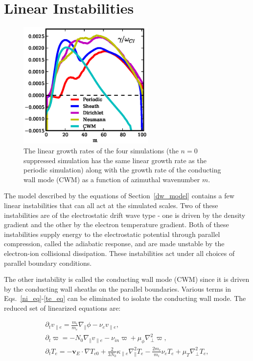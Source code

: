 \documentclass[showpacs,preprintnumbers,amsmath,amssymb,superscriptaddress,aip]{revtex4-1}
\def\beqar{\begin{eqnarray}}
\def\eeqar{\end{eqnarray}}
\newcommand{\pdt}{\partial_t}
\def\grad{\nabla}
\newcommand{\gradpar}{\grad_\parallel}
\newcommand{\gradperp}{\grad_\perp}
\newcommand{\vpe}{v_{\parallel e}}
\newcommand{\nue}{\nu_{e}}
\newcommand{\nuin}{\nu_{in}}
\newcommand{\kpe}{\kappa_{\parallel e}}
\newcommand{\fmie}{\frac{m_i}{m_e}}
\begin{document}
\section{Linear Instabilities}
\label{sec_linear}

\begin{figure}[!htbp]
\includegraphics[width=0.6\textwidth]{gamma_comparisons}
\hfil
\caption{The linear growth rates of the four simulations (the $n=0$ suppressed simulation has the same linear growth rate as the periodic simulation) along with the growth rate of 
the conducting wall mode (CWM) as a function of azimuthal wavenumber $m$.}
\label{drift_cwm_gamma}
\end{figure}


The model described by the equations of Section~\ref{dw_model} contains a few linear instabilities that can all act at the simulated scales. Two of these instabilities are of the electrostatic
drift wave type - one is driven by the density gradient and the other by the electron temperature gradient. Both of these instabilities supply energy to the electrostatic potential through parallel
compression, called the adiabatic response, and are made unstable by the electron-ion collisional dissipation. These instabilities act under all choices of parallel boundary conditions.

The other instability is called the conducting wall mode (CWM) since it is driven by the conducting wall sheaths on the parallel boundaries. Various terms in Eqs.~\ref{ni_eq}-\ref{te_eq} 
can be eliminated to isolate the conducting wall mode. The reduced set of linearized equations are:

\beqar
\label{ve_eq2}
\pdt \vpe = \fmie \gradpar \phi - \nue \vpe, \\
\label{rho_eq2}
\pdt \varpi = - N_0 \gradpar \vpe - \nuin \varpi + \mu_\phi \gradperp^2 \varpi, \\
\label{te_eq2}
\pdt T_e = - {\mathbf v_E} \cdot \grad T_{e0} + \frac{2}{3 N_0} \kpe \gradpar^2 T_e  - \frac{2 m_e}{m_i} \nue T_e  + \mu_T \gradperp^2 T_e,
\eeqar
\end{document}

